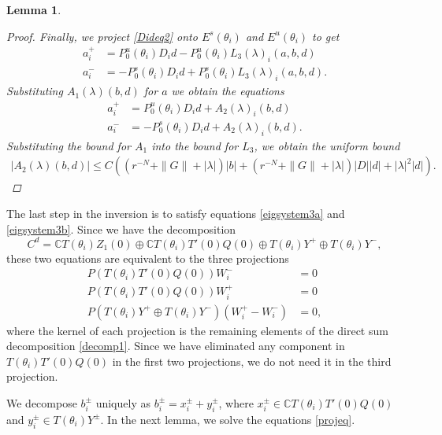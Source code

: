 \documentclass[12pt]{elsarticle}
\def\C{{\mathbb C}}
\newtheorem{lemma}{Lemma}
\begin{document}
\begin{lemma}
\begin{proof}
\noindent Finally, we project \cref{Dideq2} onto $E^s(\theta_i)$ and $E^u(\theta_i)$ to get
\begin{align*}
a_i^+ &= P_0^u(\theta_i) D_i d - P_0^u(\theta_i) L_3(\lambda)_i(a,b,d) \\
a_i^- &= -P_0^s(\theta_i) D_i d + P_0^s(\theta_i) L_3(\lambda)_i(a,b,d).
\end{align*}
Substituting $A_1(\lambda)(b,d)$ for $a$ we obtain the equations
\begin{align*}
a_i^+ &= P_0^u(\theta_i) D_i d + A_2(\lambda)_i(b,d) \\
a_i^- &= -P_0^s(\theta_i) D_i d + A_2(\lambda)_i(b,d).
\end{align*}
Substituting the bound for $A_1$ into the bound for $L_3$, we obtain the uniform bound
\begin{align*}
|A_2(\lambda)(b,d)| \leq 
C\left( (r^{-N} + \|G\| + |\lambda| )|b| + (r^{-N} + \|G\| + |\lambda|)|D||d| + |\lambda|^2 |d|  \right).
\end{align*}
\end{proof}
\end{lemma}

The last step in the inversion is to satisfy equations \cref{eigsystem3a} and \cref{eigsystem3b}. Since we have the decomposition
\begin{equation}\label{decomp1}
C^d = \C T(\theta_i) Z_1(0) \oplus \C T(\theta_i) T'(0)Q(0) \oplus T(\theta_i) Y^+ \oplus T(\theta_i) Y^-,
\end{equation}
these two equations are equivalent to the three projections
\begin{equation}\label{projeq}
\begin{aligned}
P(T(\theta_i) T'(0)Q(0)) W_i^- &= 0 \\
P(T(\theta_i) T'(0)Q(0)) W_i^+ &= 0 \\
P(T(\theta_i) Y^+ \oplus T(\theta_i) Y^-) (W_i^+ - W_i^-) &= 0,
\end{aligned}
\end{equation}
where the kernel of each projection is the remaining elements of the direct sum decomposition \cref{decomp1}. Since we have eliminated any component in $T(\theta_i) T'(0)Q(0)$ in the first two projections, we do not need it in the third projection.

We decompose $b_i^\pm$ uniquely as $b_i^\pm = x_i^\pm + y_i^\pm$, where $x_i^\pm \in \C T(\theta_i) T'(0)Q(0)$ and $y_i^\pm \in T(\theta_i) Y^\pm$. In the next lemma, we solve the equations \cref{projeq}.
\end{document}
